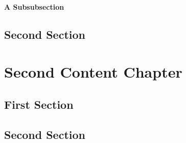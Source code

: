 \Blindtext

\subsubsection{A Subsubsection}

\Blindtext[1]

\section{Second Section}
\label{sec:FirstContent:SecondSection}

\Blindtext


\chapter{Second Content Chapter}
\label{ch:SecondContent}

\Blindtext

\section{First Section}
\label{sec:SecondContent:FirstSection}

\Blindtext

\section{Second Section}
\label{sec:SecondContent:SecondSection}

\Blindtext

